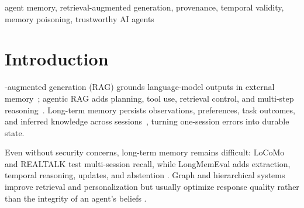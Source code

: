 \begin{abstract}
Agentic RAG often persists retrieved text as long-term memory, allowing stale, contradictory, unsupported, or malicious writes to influence later sessions. ClaimLedger is an append-only, claim-level integrity layer: it decomposes writes into atomic claims and records provenance, valid and transaction time, trust tier, confidence, lifecycle state, supersession, and conflict relations. Status-aware temporal, conflict, provenance, and quarantine gates produce an auditable retrieval decision. A SQLite prototype runs the official REALTALK release (10 human-human conversations, 219 sessions, 8,944 turns, 726 evidence-linked annotated memory questions) with controlled conflict/poison overlays and 209 timestamp-derived transitions: 2,387 mechanism cases. Removing the conflict gate drops exact active-claim accuracy from 1.000 to 0.696, removing valid-time filtering drops temporal accuracy to 0.000, and naive active memory reaches only 0.392 exact accuracy with 1.000 poison activation; a lexical-retrieval control given the same gold labels but no gate reproduces the naive failure, confirming the deltas come from the ledger gates, not the labels. Under oracle labels (relations supplied, not extracted), the gates execute perfectly across three deterministic seeds---gate-correctness checks given gold labels, not evidence of autonomous label production, end-to-end QA superiority, or adaptive-attack resistance.
\end{abstract}

\begin{IEEEkeywords}
agent memory, retrieval-augmented generation, provenance, temporal validity, memory poisoning, trustworthy AI agents
\end{IEEEkeywords}

\section{Introduction}\label{sec:intro}

-augmented generation (RAG) grounds language-model outputs in external memory~\cite{lewis2020rag}; agentic RAG adds planning, tool use, retrieval control, and multi-step reasoning~\cite{singh2025agenticrag}. Long-term memory persists observations, preferences, task outcomes, and inferred knowledge across sessions~\cite{hu2025memorysurvey}, turning one-session errors into durable state.

Even without security concerns, long-term memory remains difficult: LoCoMo and REALTALK test multi-session recall, while LongMemEval adds extraction, temporal reasoning, updates, and abstention \cite{maharana2024locomo,realtalk2025,wu2024longmemeval}. Graph and hierarchical systems improve retrieval and personalization but usually optimize response quality rather than the integrity of an agent's beliefs \cite{rasmussen2025zep,kang2025memoryos,xu2025amem}.

